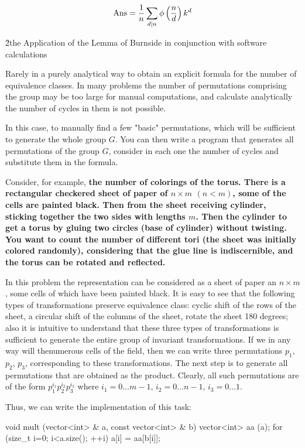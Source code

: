 $$ {\rm Ans} = \frac{1}{n} \sum_{d|n} \phi \left( \frac{n}{d} \right) k^d $$

\h2{the Application of the Lemma of Burnside in conjunction with software calculations}

Rarely in a purely analytical way to obtain an explicit formula for the number of equivalence classes. In many problems the number of permutations comprising the group may be too large for manual computations, and calculate analytically the number of cycles in them is not possible.

In this case, to manually find a few "basic" permutations, which will be sufficient to generate the whole group $G$. You can then write a program that generates all permutations of the group $G$, consider in each one the number of cycles and substitute them in the formula.

Consider, for example, \bf{the number of colorings of the torus}. There is a rectangular checkered sheet of paper of $n \times m$ $(n < m)$, some of the cells are painted black. Then from the sheet receiving cylinder, sticking together the two sides with lengths $m$. Then the cylinder to get a torus by gluing two circles (base of cylinder) without twisting. You want to count the number of different tori (the sheet was initially colored randomly), considering that the glue line is indiscernible, and the torus can be rotated and reflected.

In this problem the representation can be considered as a sheet of paper an $n \times m$, some cells of which have been painted black. It is easy to see that the following types of transformations preserve equivalence class: cyclic shift of the rows of the sheet, a circular shift of the columns of the sheet, rotate the sheet 180 degrees; also it is intuitive to understand that these three types of transformations is sufficient to generate the entire group of invariant transformations. If we in any way will thenumerous cells of the field, then we can write three permutations $p_1$, $p_2$, $p_3$, corresponding to these transformations. The next step is to generate all permutations that are obtained as the product. Clearly, all such permutations are of the form $p_1^{i_1} p_2^{i_2} p_3^{i_3}$ where $i_1 = 0 \ldots m-1$, $i_2 = 0 \ldots n-1$, $i_3 = 0 \ldots 1$.

Thus, we can write the implementation of this task:

\code
void mult (vector<int> & a, const vector<int> & b) {
vector<int> aa (a);
for (size_t i=0; i<a.size(); ++i)
a[i] = aa[b[i]];
}

